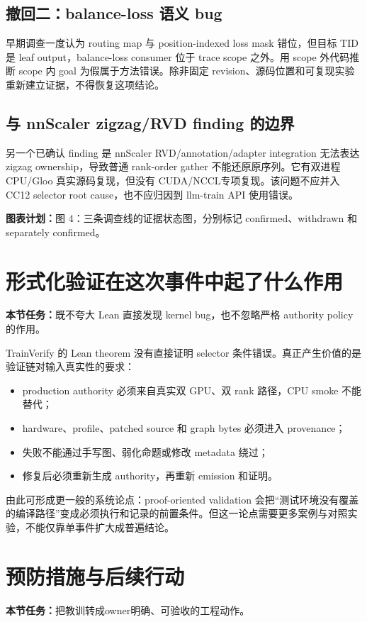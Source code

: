 \documentclass[11pt,a4paper]{ctexart}
\newcommand{\contract}[1]{\par\smallskip\noindent\colorbox{light}{\parbox{0.95\linewidth}{\textbf{本节任务：}#1}}\par\smallskip}
\newcommand{\figplan}[1]{\par\noindent\textbf{图表计划：}#1\par}
\begin{document}
\subsection{撤回二：balance-loss 语义 bug}
早期调查一度认为 routing map 与 position-indexed loss mask 错位，但目标 TID 是 leaf output，balance-loss consumer 位于 trace scope 之外。用 scope 外代码推断 scope 内 goal 为假属于方法错误。除非固定 revision、源码位置和可复现实验重新建立证据，不得恢复这项结论。

\subsection{与 nnScaler zigzag/RVD finding 的边界}
另一个已确认 finding 是 nnScaler RVD/annotation/adapter integration 无法表达 zigzag ownership，导致普通 rank-order gather 不能还原原序列。它有双进程 CPU/Gloo 真实源码复现，但没有 CUDA/NCCL专项复现。该问题不应并入 CC12 selector root cause，也不应归因到 llm-train API 使用错误。

\figplan{图 4：三条调查线的证据状态图，分别标记 confirmed、withdrawn 和 separately confirmed。}

\section{形式化验证在这次事件中起了什么作用}
\contract{既不夸大 Lean 直接发现 kernel bug，也不忽略严格 authority policy 的作用。}

TrainVerify 的 Lean theorem 没有直接证明 selector 条件错误。真正产生价值的是验证链对输入真实性的要求：
\begin{itemize}
  \item production authority 必须来自真实双 GPU、双 rank 路径，CPU smoke 不能替代；
  \item hardware、profile、patched source 和 graph bytes 必须进入 provenance；
  \item 失败不能通过手写图、弱化命题或修改 metadata 绕过；
  \item 修复后必须重新生成 authority，再重新 emission 和证明。
\end{itemize}

由此可形成更一般的系统论点：proof-oriented validation 会把“测试环境没有覆盖的编译路径”变成必须执行和记录的前置条件。但这一论点需要更多案例与对照实验，不能仅靠单事件扩大成普遍结论。

\section{预防措施与后续行动}
\contract{把教训转成owner明确、可验收的工程动作。}
\end{document}
